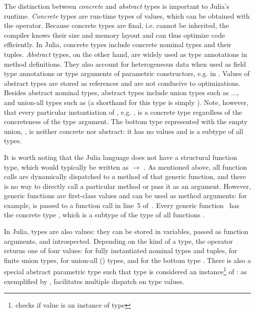 The distinction between \emph{concrete} and \emph{abstract} types
is important to Julia's runtime.
\emph{Concrete} types are run-time types of values, which can be
obtained with the  operator. Because concrete types are final, 
i.e. cannot be inherited, the compiler knows their size and memory layout
and can thus optimize code efficiently.
In Julia, concrete types include concrete nominal types and their tuples.
\emph{Abstract} types, on the other hand,
are widely used as type annotations in method definitions.
They also account for heterogeneous data when used as field type annotations
or type arguments of parametric constructors, e.g. in .
Values of abstract types are stored as references and are not conducive
to optimizations.
Besides abstract nominal types, abstract types include union types
such as $\ldots$, and union-all types
such as  (a shorthand for this type 
is simply ). Note, however, that every particular instantiation of
, e.g. , is a concrete type
regardless of the concreteness of the type argument.
The bottom type represented with the empty union, , is neither
concrete nor abstract: it has no values and is a subtype of all types.

It is worth noting that the Julia language does not have a structural function type,
which would typically be written as  $\rightarrow$ . As mentioned above,
all function calls are dynamically dispatched to a method of that generic
function, and there is no way to directly call a particular method or
pass it as an argument.
However, generic functions are first-class values and can be used as
method arguments: for example, \cjl{(-)} is passed to a function call in line~5
of~.
Every generic function~ has the concrete type ,
which is a subtype of the type of all functions .

In Julia, types are also values: they can be stored in variables, 
passed as function arguments, and introspected.
Depending on the kind of a type, the  operator returns
one of four values:
 for fully instantiated nominal types and tuples,
 for finite union types,
 for union-all () types,
and  for the bottom type .
There is also a special abstract parametric type 
such that type  is considered an instance\footnote{
checks if value  is an instance of type } of :
as exemplified by ,
 facilitates multiple dispatch on type values.

